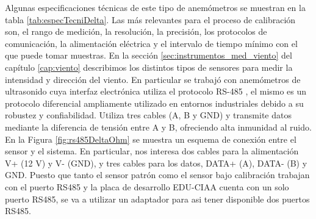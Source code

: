  Algunas especificaciones técnicas de este tipo de anemómetros se muestran en la tabla \ref{tab:especTecniDelta}. Las más relevantes para el proceso de calibración son, el rango de medición, la resolución, la precisión, los protocolos de comunicación, la alimentación eléctrica y el intervalo de tiempo mínimo con el que puede tomar muestras. En la sección \ref{sec:instrumentos_med_viento} del capítulo \ref{cap:viento} describimos los distintos tipos de sensores para medir la intensidad y dirección del viento. En particular se trabajó con anemómetros de ultrasonido cuya interfaz electrónica utiliza el protocolo RS-485 \cite{rs485Protocol}, el mismo es un protocolo diferencial ampliamente utilizado en entornos industriales debido a su robustez y confiabilidad. Utiliza tres cables (A, B y GND) y transmite datos mediante la diferencia de tensión entre A y B, ofreciendo alta inmunidad al ruido. En la Figura \ref{fig:rs485DeltaOhm} se muestra un esquema de conexión entre el sensor y el sistema. En particular, nos interesa dos cables para la alimentación V+ (12 \unit{\volt}) y V- (GND), y tres cables para los datos, DATA+ (A), DATA- (B) y GND. Puesto que tanto el sensor patrón como el sensor bajo calibración trabajan con el puerto RS485 y la placa de desarrollo EDU-CIAA cuenta con un solo puerto RS485, se va a utilizar un adaptador para asi tener disponible dos puertos RS485. 

